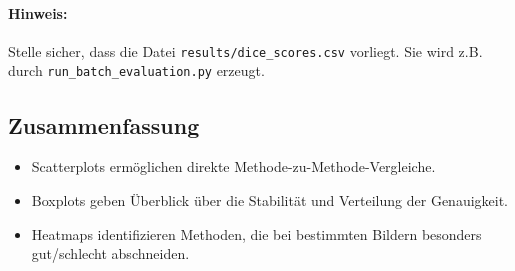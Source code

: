 \documentclass[a4paper,12pt]{article}
\begin{document}
\paragraph{Hinweis:} Stelle sicher, dass die Datei \texttt{results/dice\_scores.csv} vorliegt. Sie wird z.B. durch \texttt{run\_batch\_evaluation.py} erzeugt.

\vspace{1em}
\subsection{Zusammenfassung}

\begin{itemize}
    \item Scatterplots ermöglichen direkte Methode-zu-Methode-Vergleiche.
    \item Boxplots geben Überblick über die Stabilität und Verteilung der Genauigkeit.
    \item Heatmaps identifizieren Methoden, die bei bestimmten Bildern besonders gut/schlecht abschneiden.
\end{itemize}
\end{document}
